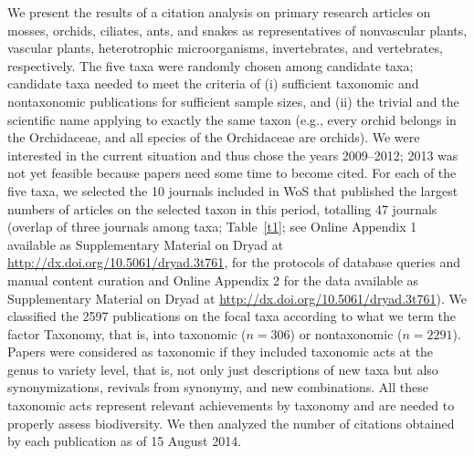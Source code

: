 \documentclass[webpdf,PV,mynatbib,surname,CE,MSC]{SYS-PV}
\begin{document}
We present the results of a citation analysis on primary research articles on mosses, orchids,
ciliates, ants, and snakes as representatives of nonvascular plants, vascular plants,
heterotrophic microorganisms, invertebrates, and vertebrates, respectively. The five taxa were
randomly chosen among candidate taxa; candidate taxa needed to meet the criteria of (i) sufficient
taxonomic and nontaxonomic publications for sufficient sample sizes, and (ii) the trivial and the
scientific name applying to exactly the same taxon (e.g., every orchid belongs in the Orchidaceae,
and all species of the Orchidaceae are orchids). We were interested in the current situation and
thus chose the years 2009--2012; 2013 was not yet feasible because papers need some time to become
cited. For each of the five taxa, we selected the 10 journals included in WoS that published the
largest numbers of articles on the selected taxon in this period, totalling 47 journals (overlap
of three journals among taxa; Table~\ref{t1}; see Online Appendix 1 available as Supplementary
Material on Dryad at
\href{http://dx.doi.org/10.5061/dryad.3t761}{http://dx.doi.org/10.5061/dryad.3t761}, for the
protocols of database queries and manual content curation and Online Appendix 2 for the data
available as Supplementary Material on Dryad at
\href{http://dx.doi.org/10.5061/dryad.3t761}{http://dx.doi.org/10.5061/dryad.3t761}). We
classified the 2597 publications on the focal taxa according to what we term the factor Taxonomy,
that is, into taxonomic \hbox{($n=306$)} or nontaxonomic ($n=2291$). Papers were considered as
taxonomic if they included taxonomic acts at the genus to variety level, that is, not only just
descriptions of new taxa but also synonymizations, revivals from synonymy, and new combinations.
All these taxonomic acts represent relevant achievements by taxonomy and are needed to properly
assess biodiversity. We then analyzed the number of citations obtained by each publication as of
15 August 2014.
\end{document}
